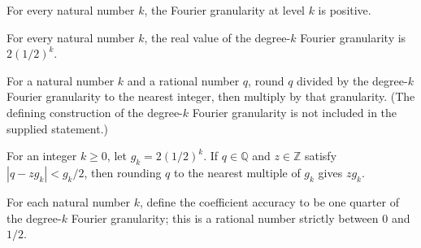 \begin{theorem}
\label{FABL.degreeFourierGranularity_pos}
\leanok
{}
For every natural number $k$, the Fourier granularity at level $k$ is positive.
\end{theorem}

\begin{theorem}
\label{FABL.degreeFourierGranularity_cast}
\leanok
{}
For every natural number $k$, the real value of the degree-$k$ Fourier granularity is
$2(1/2)^k$.
\end{theorem}

\begin{definition}
\label{FABL.roundToDegreeFourierGranularity}
\leanok
{}
For a natural number $k$ and a rational number $q$, round $q$ divided by the degree-$k$
Fourier granularity to the nearest integer, then multiply by that granularity. (The
defining construction of the degree-$k$ Fourier granularity is not included in the
supplied statement.)
\end{definition}

\begin{theorem}
\label{FABL.roundToDegreeFourierGranularity_eq_of_close}
\leanok
{}
For an integer $k\ge 0$, let $g_k=2(1/2)^k$. If $q\in\mathbb Q$ and $z\in\mathbb Z$
satisfy $|q-zg_k|<g_k/2$, then rounding $q$ to the nearest multiple of $g_k$ gives
$zg_k$.
\end{theorem}

\begin{definition}
\label{FABL.degreeFourierCoefficientAccuracy}
\leanok
{}
For each natural number $k$, define the coefficient accuracy to be one quarter of the
degree-$k$ Fourier granularity; this is a rational number strictly between $0$ and
$1/2$.
\end{definition}

